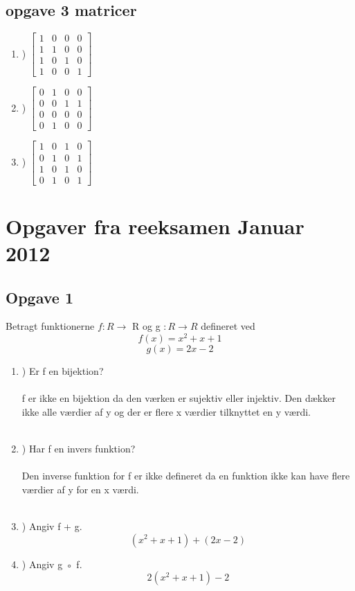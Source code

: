 \documentclass[a4paper,12pt]{article}
\begin{document}
\subsection{opgave 3 matricer}
\begin{enumerate}
	\item) \(\begin{bmatrix}
			1 & 0 & 0 & 0\\
			1 & 1 & 0 & 0\\
			1 & 0 & 1 & 0\\
			1 & 0 & 0 & 1
			\end{bmatrix}\)
			
	\item) \(\begin{bmatrix}
			0 & 1 & 0 & 0\\
			0 & 0 & 1 & 1\\
			0 & 0 & 0 & 0\\
			0 & 1 & 0 & 0
			\end{bmatrix}\)
			
	\item) \(\begin{bmatrix}
			1 & 0 & 1 & 0\\
			0 & 1 & 0 & 1\\
			1 & 0 & 1 & 0\\
			0 & 1 & 0 & 1
			\end{bmatrix}\)
\end{enumerate}


\section{Opgaver fra reeksamen Januar 2012}
\subsection{Opgave 1}
Betragt funktionerne $f : R \longrightarrow$ R og g $: R \longrightarrow R $ defineret ved 
$$f(x) = x^2 + x + 1$$
$$g(x) = 2x - 2$$
\begin{enumerate}

\item) Er f en bijektion?  \\\\
f er ikke en bijektion da den værken er sujektiv eller injektiv. Den dækker ikke alle værdier af y og der er flere x værdier tilknyttet en y værdi.
\\
\\
\item) Har f en invers funktion?
\\
\\
Den inverse funktion for f er ikke defineret da en funktion ikke kan have flere værdier af y for en x værdi.
\\
\\
\item) Angiv f + g.
$$(x^2 + x + 1) + (2x-2)$$
\item) Angiv g ◦ f.
$$2(x^2+x+1) - 2$$
\end{enumerate}
\end{document}
